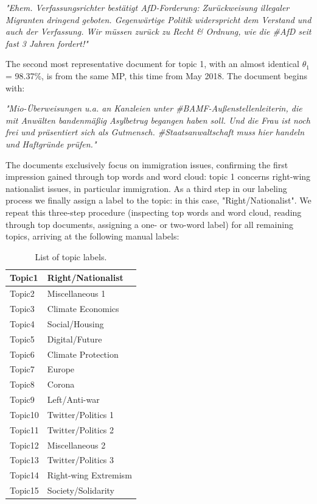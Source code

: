 \vspace{0.5cm}
\noindent
\textit{"Ehem. Verfassungsrichter bestätigt AfD-Forderung: Zurückweisung illegaler Migranten dringend geboten. Gegenwärtige Politik widerspricht dem Verstand und auch der Verfassung. Wir müssen zurück zu Recht \& Ordnung, wie die \#AfD seit fast 3 Jahren fordert!"}
\vspace{0.5cm}

The second most representative document for topic 1, with an almost identical $\theta_1$ = 98.37\%, is from the same MP, this time from May 2018. The document begins with:

\vspace{0.5cm}
\noindent
\textit{"Mio-Überweisungen u.a. an Kanzleien unter \#BAMF-Außenstellenleiterin, die mit Anwälten bandenmäßig Asylbetrug begangen haben soll. Und die Frau ist noch frei und präsentiert sich als Gutmensch. \#Staatsanwaltschaft muss hier handeln und Haftgründe prüfen."}
\vspace{0.5cm}

The documents exclusively focus on immigration issues, confirming the first impression gained through top words and word cloud: topic 1 concerns right-wing nationalist issues, in particular immigration. As a third step in our labeling process we finally assign a label to the topic: in this case, "Right/Nationalist". We repeat this three-step procedure (inspecting top words and word cloud, reading through top documents, assigning a one- or two-word label) for all remaining topics, arriving at the following manual labels:

\begin{table}[h!]
	\centering
	\captionsetup{justification=centering,margin=2cm}
	\begin{tabular}{|l|l|}
	\hline
	Topic1  & Right/Nationalist    \\ \hline
	Topic2  & Miscellaneous 1      \\ \hline
	Topic3  & Climate Economics    \\ \hline
	Topic4  & Social/Housing       \\ \hline
	Topic5  & Digital/Future       \\ \hline
	Topic6  & Climate Protection   \\ \hline
	Topic7  & Europe               \\ \hline
	Topic8  & Corona               \\ \hline
	Topic9  & Left/Anti-war        \\ \hline
	Topic10 & Twitter/Politics 1   \\ \hline
	Topic11 & Twitter/Politics 2   \\ \hline
	Topic12 & Miscellaneous 2      \\ \hline
	Topic13 & Twitter/Politics 3   \\ \hline
	Topic14 & Right-wing Extremism \\ \hline
	Topic15 & Society/Solidarity   \\ \hline
	\end{tabular}
	\caption{List of topic labels.}
	\label{tab:labels}
\end{table}

